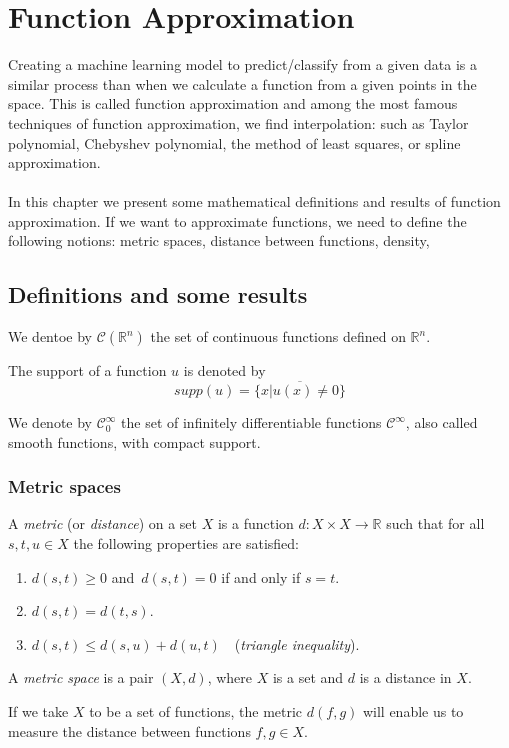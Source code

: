 \documentclass[../main.tex]{subfiles}
\begin{document}
\chapter{Function Approximation} \label{ch:methods}
\noindent Creating a machine learning model to predict/classify from a given data is a similar process than when we calculate a function from a given points in the space. This is called function approximation and among the most famous techniques of function approximation, we find interpolation: such as Taylor polynomial, Chebyshev polynomial, the method of least squares, or spline approximation. \\ \\ 
\noindent In this chapter we present some mathematical definitions and results of function approximation. 
If we want to approximate functions, we need to define the following notions: metric spaces, distance between functions, density,
\section{Definitions and some results}



\begin{definition} We dentoe by $\mathcal{C}(\mathbb{R}^n)$ the set of continuous functions defined on $\mathbb{R}^n$.
\end{definition}
\begin{definition}
	The support of a function $u$ is denoted by $$supp(u)= \overline{\{x | u(x)\neq 0\}}$$
\end{definition}
\begin{definition} We denote by
	$ \mathcal{C}^\infty_0$ the set of infinitely differentiable functions $\mathcal{C}^\infty$, also called smooth functions, with compact support. 
\end{definition}

\subsection{Metric spaces}
\begin{definition}\label{thm:first}
	A \emph{metric} (or \emph{distance}) on a set $X$ is a function $d:X\times X\rightarrow \mathbb{R} $ such that for all $s,t, u\in X$ the following properties are satisfied:
	\begin{enumerate}
		\item $d(s,t) \geq 0$ and $ \, d(s,t)=0$ if and only if $ s=t$.
		\item $d(s,t)=d(t,s)$.
		\item $d(s,t)\leq d(s,u)+d(u,t)\quad$(\emph{triangle inequality}).
	\end{enumerate}
\begin{definition}
A \emph{metric space} is a pair $(X,d)$, where $X$ is a set and $d$ is a distance in $X$.
\end{definition}
\end{definition}
\noindent  If we take $X$ to be a set of functions, the metric $d(f,g)$ will enable us to measure the distance between functions $f,g \in X$.
\end{document}
